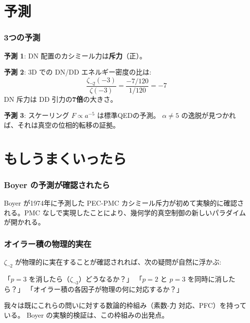 \documentclass[12pt,a4paper]{article}
\begin{document}
\part{予測}

\section{3つの予測}

\begin{resultbox}[具体的な数値予測]
\textbf{予測 1}: DN 配置のカシミール力は\textbf{斥力}（正）。

\textbf{予測 2}: 3D での DN/DD エネルギー密度の比は:
$$\frac{\zeta_{\neg 2}(-3)}{\zeta(-3)} = \frac{-7/120}{1/120} = -7$$
DN 斥力は DD 引力の\textbf{7倍}の大きさ。

\textbf{予測 3}: スケーリング $F \propto a^{-5}$ は標準QEDの予測。
$\alpha \neq 5$ の逸脱が見つかれば、それは真空の位相的転移の証拠。
\end{resultbox}

\part{もしうまくいったら}

\section{Boyer の予測が確認されたら}

\begin{storybox}[50年越しの検証]
Boyer が1974年に予測した PEC-PMC カシミール斥力が初めて実験的に確認される。PMC なしで実現したことにより、幾何学的真空制御の新しいパラダイムが開かれる。
\end{storybox}

\section{オイラー積の物理的実在}

\begin{storybox}[素数が真空を支配する？]
$\zeta_{\neg 2}$ が物理的に実在することが確認されれば、次の疑問が自然に浮かぶ:

「$p=3$ を消したら（$\zeta_{\neg 3}$）どうなるか？」
「$p=2$ と $p=3$ を同時に消したら？」
「オイラー積の各因子が物理の何に対応するか？」

我々は既にこれらの問いに対する数論的枠組み（素数-力 対応、PFC）を持っている。
Boyer の実験的検証は、この枠組みの出発点。
\end{storybox}
\end{document}
